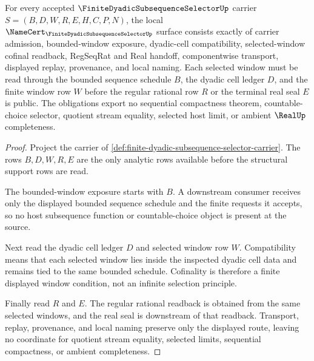 \begin{theorem}
\label{thm:finite-dyadic-subsequence-selector-namecert-obligations}
For every accepted $\FiniteDyadicSubsequenceSelectorUp$ carrier $S=(B,D,W,R,E,H,C,P,N)$, the local $\NameCert_{\FiniteDyadicSubsequenceSelectorUp}$ surface consists exactly of carrier admission, bounded-window exposure, dyadic-cell compatibility, selected-window cofinal readback, RegSeqRat and Real handoff, componentwise transport, displayed replay, provenance, and local naming. Each selected window must be read through the bounded sequence schedule $B$, the dyadic cell ledger $D$, and the finite window row $W$ before the regular rational row $R$ or the terminal real seal $E$ is public. The obligations export no sequential compactness theorem, countable-choice selector, quotient stream equality, selected host limit, or ambient $\RealUp$ completeness.
\end{theorem}
\begin{proof}
Project the carrier of \autoref{def:finite-dyadic-subsequence-selector-carrier}. The rows $B,D,W,R,E$ are the only analytic rows available before the structural support rows are read.

The bounded-window exposure starts with $B$. A downstream consumer receives only the displayed bounded sequence schedule and the finite requests it accepts, so no host subsequence function or countable-choice object is present at the source.

Next read the dyadic cell ledger $D$ and selected window row $W$. Compatibility means that each selected window lies inside the inspected dyadic cell data and remains tied to the same bounded schedule. Cofinality is therefore a finite displayed window condition, not an infinite selection principle.

Finally read $R$ and $E$. The regular rational readback is obtained from the same selected windows, and the real seal is downstream of that readback. Transport, replay, provenance, and local naming preserve only the displayed route, leaving no coordinate for quotient stream equality, selected limits, sequential compactness, or ambient completeness.
\end{proof}

